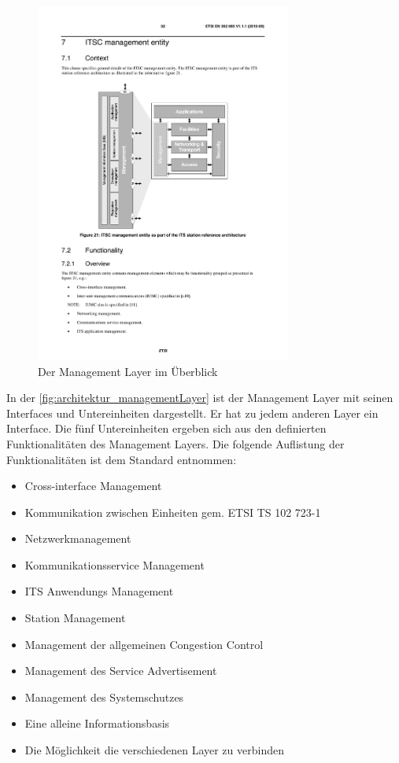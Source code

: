 \begin{figure}
	\includegraphics[width=0.75\textwidth]{content/images/02_architektur/managementLayer.pdf}
	\caption{Der Management Layer im Überblick \cite{etsi2010302}}
	\label{fig:architektur_managementLayer}
\end{figure}
In der  \autoref{fig:architektur_managementLayer} ist der Management Layer mit seinen Interfaces und Untereinheiten dargestellt. Er hat zu jedem anderen Layer ein Interface. Die fünf Untereinheiten ergeben sich aus den definierten Funktionalitäten des Management Layers. Die folgende Auflistung der Funktionalitäten ist dem Standard \cite{etsi2010302} entnommen:

\begin{itemize}
	\item Cross-interface Management
	\item Kommunikation zwischen Einheiten gem. ETSI TS 102 723-1
	\item Netzwerkmanagement
	\item Kommunikationsservice Management
	\item \ac{ITS} Anwendungs Management
	\item Station Management
	\item Management der allgemeinen Congestion Control
	\item Management des Service Advertisement
	\item Management des Systemschutzes 
	\item Eine alleine Informationsbasis
	\item Die Möglichkeit die verschiedenen Layer zu verbinden
\end{itemize}

